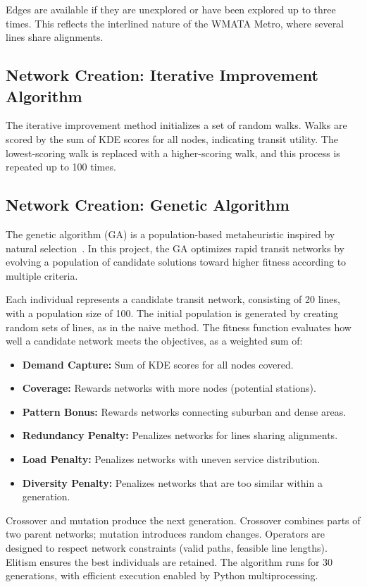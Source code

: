 \documentclass[manuscript]{acmart}
\begin{document}
Edges are available if they are unexplored or have been explored up to three times. This reflects the interlined nature of the WMATA Metro, where several lines share alignments.

\subsection{Network Creation: Iterative Improvement Algorithm}

The iterative improvement method initializes a set of random walks. Walks are scored by the sum of KDE scores for all nodes, indicating transit utility. The lowest-scoring walk is replaced with a higher-scoring walk, and this process is repeated up to 100 times.

\subsection{Network Creation: Genetic Algorithm}
The genetic algorithm (GA) is a population-based metaheuristic inspired by natural selection~\cite{bib:chien2001genetic, bib:dib2017ga}. In this project, the GA optimizes rapid transit networks by evolving a population of candidate solutions toward higher fitness according to multiple criteria.

Each individual represents a candidate transit network, consisting of 20 lines, with a population size of 100. The initial population is generated by creating random sets of lines, as in the naive method. The fitness function evaluates how well a candidate network meets the objectives, as a weighted sum of:
\begin{itemize}
    \item \textbf{Demand Capture:} Sum of KDE scores for all nodes covered.
    \item \textbf{Coverage:} Rewards networks with more nodes (potential stations).
    \item \textbf{Pattern Bonus:} Rewards networks connecting suburban and dense areas.
    \item \textbf{Redundancy Penalty:} Penalizes networks for lines sharing alignments.
    \item \textbf{Load Penalty:} Penalizes networks with uneven service distribution.
    \item \textbf{Diversity Penalty:} Penalizes networks that are too similar within a generation.
\end{itemize}

Crossover and mutation produce the next generation. Crossover combines parts of two parent networks; mutation introduces random changes. Operators are designed to respect network constraints (valid paths, feasible line lengths). Elitism ensures the best individuals are retained. The algorithm runs for 30 generations, with efficient execution enabled by Python multiprocessing.
\end{document}
